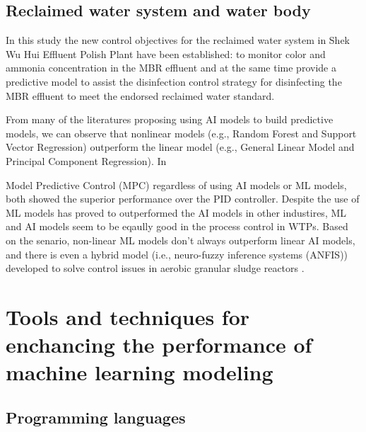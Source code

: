 \subsection{Reclaimed water system and water body}

In this study the new control objectives for the reclaimed water system in Shek Wu Hui Effluent Polish Plant have been established: to monitor color and ammonia concentration in the MBR effluent and at the same time provide a predictive model to assist the disinfection control strategy for disinfecting the MBR effluent to meet the endorsed reclaimed water standard.

From many of the literatures proposing using AI models to build predictive models, we can observe that nonlinear models (e.g., Random Forest and Support Vector Regression) outperform the linear model (e.g., General Linear Model and Principal Component Regression). In 

Model Predictive Control (MPC) regardless of using AI models or ML models, both showed the superior performance over the PID controller. Despite the use of ML models has proved to outperformed the AI models in other industires, ML and AI models seem to be eqaully good in the process control in WTPs. Based on the senario, non-linear ML models don't always outperform linear AI models, and there is even a hybrid model (i.e., neuro-fuzzy inference systems (ANFIS)) developed to solve control issues in aerobic granular sludge reactors \citep{zaghloulDevelopmentEnsembleMachine2021}.
\section{Tools and techniques for enchancing the performance of machine learning modeling}
\subsection{Programming languages}
\citep{mamandipoorMonitoringDetectingFaults2020}
